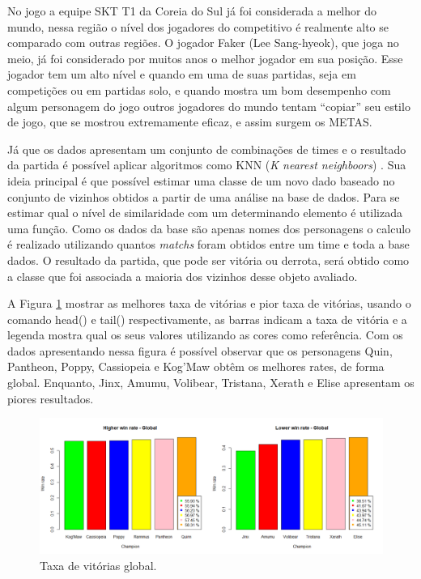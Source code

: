 \documentclass[a4paper]{article}
\begin{document}
No jogo a equipe SKT T1 da Coreia do Sul já foi considerada a melhor do mundo, nessa região o nível dos jogadores do competitivo é realmente alto se comparado com outras regiões. O jogador Faker (Lee Sang-hyeok), que joga no meio, já foi considerado por muitos anos o melhor jogador em sua posição. Esse jogador tem um alto nível e quando em uma de suas partidas, seja em competições ou em partidas solo, e quando mostra um bom desempenho com algum personagem do jogo outros jogadores do mundo tentam “copiar” seu estilo de jogo, que se mostrou extremamente eficaz, e assim surgem os METAS.


Já que os dados apresentam um conjunto de combinações de times e o resultado da partida é possível aplicar algoritmos como KNN (\textit{K nearest neighboors}) \cite{fukunaga1975branch}. Sua ideia principal é que possível estimar uma classe de um novo dado baseado no conjunto de vizinhos obtidos a partir de uma análise na base de dados. Para se estimar qual o nível de similaridade com um determinando elemento é utilizada uma função. Como os dados da base são apenas nomes dos personagens o calculo é realizado utilizando quantos \textit{matchs} foram obtidos entre um time e toda a base dados. O resultado da partida, que pode ser vitória ou derrota, será obtido como a classe que foi associada a maioria dos vizinhos desse objeto avaliado. 


A Figura \ref{fig:win_rate} mostrar as melhores taxa de vitórias e pior taxa de vitórias, usando o comando head() e tail() respectivamente, as barras indicam a taxa de vitória e a legenda mostra qual os seus valores utilizando as cores como referência. Com os dados apresentando nessa figura é possível observar que os personagens Quin, Pantheon, Poppy, Cassiopeia e Kog’Maw obtêm os melhores rates, de forma global. Enquanto, Jinx, Amumu, Volibear, Tristana, Xerath e Elise apresentam os piores resultados. 

\begin{figure}
\centering
\includegraphics[width=0.7\columnwidth]{imagens/Rplot}
\caption{\label{fig:win_rate}Taxa de vitórias global.}
\end{figure}
\end{document}
